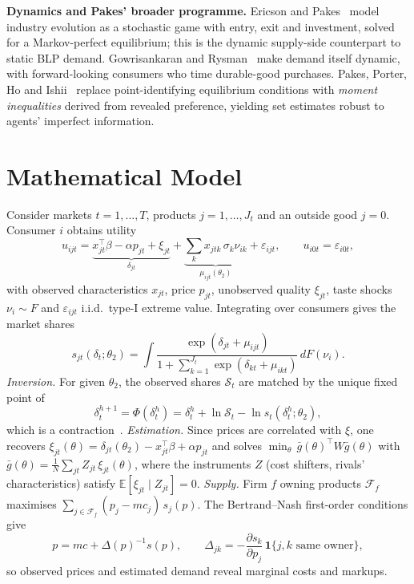 \documentclass[10pt,a4paper]{article}
\begin{document}
\textbf{Dynamics and Pakes' broader programme.} Ericson and
Pakes~\cite{EricsonPakes1995} model industry evolution as a stochastic game with
entry, exit and investment, solved for a Markov-perfect equilibrium; this is the
dynamic supply-side counterpart to static BLP demand. Gowrisankaran and
Rysman~\cite{GowrisankaranRysman2012} make demand itself dynamic, with
forward-looking consumers who time durable-good purchases. Pakes, Porter, Ho
and Ishii~\cite{PPHI2015} replace point-identifying equilibrium conditions with
\emph{moment inequalities} derived from revealed preference, yielding set
estimates robust to agents' imperfect information.

\section{Mathematical Model}
Consider markets $t=1,\dots,T$, products $j=1,\dots,J_t$ and an outside good
$j=0$. Consumer $i$ obtains utility
\begin{equation}
u_{ijt} = \underbrace{x_{jt}^\top\beta - \alpha p_{jt} + \xi_{jt}}_{\delta_{jt}}
 + \underbrace{\textstyle\sum_k x_{jtk}\,\sigma_k \nu_{ik}}_{\mu_{ijt}(\theta_2)}
 + \varepsilon_{ijt}, \qquad u_{i0t}=\varepsilon_{i0t},
\end{equation}
with observed characteristics $x_{jt}$, price $p_{jt}$, unobserved quality
$\xi_{jt}$, taste shocks $\nu_i\sim F$ and $\varepsilon_{ijt}$ i.i.d.\ type-I
extreme value. Integrating over consumers gives the market shares
\begin{equation}
s_{jt}(\delta_t;\theta_2)=\int \frac{\exp(\delta_{jt}+\mu_{ijt})}
{1+\sum_{k=1}^{J_t}\exp(\delta_{kt}+\mu_{ikt})}\,dF(\nu_i).
\end{equation}
\emph{Inversion.} For given $\theta_2$, the observed shares $\mathcal{S}_t$ are
matched by the unique fixed point of
\begin{equation}
\delta_t^{h+1}=\Phi(\delta_t^h)=\delta_t^h+\ln \mathcal{S}_t-\ln s_t(\delta_t^h;\theta_2),
\end{equation}
which is a contraction~\cite{BLP1995}. \emph{Estimation.} Since prices are
correlated with $\xi$, one recovers
$\xi_{jt}(\theta)=\delta_{jt}(\theta_2)-x_{jt}^\top\beta+\alpha p_{jt}$ and
solves $\min_\theta\,\bar g(\theta)^\top W \bar g(\theta)$ with
$\bar g(\theta)=\frac1N\sum_{jt} Z_{jt}\,\xi_{jt}(\theta)$, where the
instruments $Z$ (cost shifters, rivals' characteristics) satisfy
$\mathbb{E}[\xi_{jt}\mid Z_{jt}]=0$.
\emph{Supply.} Firm $f$ owning products $\mathcal{F}_f$ maximises
$\sum_{j\in\mathcal F_f}(p_j-mc_j)\,s_j(p)$. The Bertrand--Nash first-order
conditions give
\begin{equation}
p = mc + \Delta(p)^{-1}s(p),\qquad
\Delta_{jk}=-\frac{\partial s_k}{\partial p_j}\,\mathbf{1}\{j,k\text{ same owner}\},
\end{equation}
so observed prices and estimated demand reveal marginal costs and markups.
\end{document}
